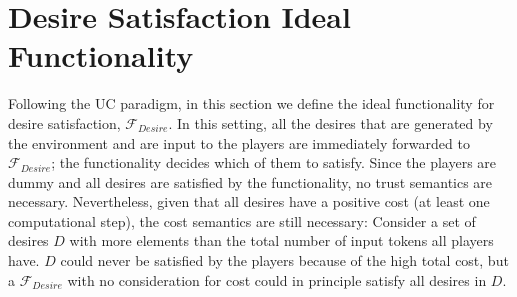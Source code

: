 \section{Desire Satisfaction Ideal Functionality}
  Following the UC paradigm, in this section we define the ideal functionality for desire satisfaction, $\mathcal{F}_{Desire}$.
  In this setting, all the desires that are generated by the environment and are input to the players are immediately forwarded
  to $\mathcal{F}_{Desire}$; the functionality decides which of them to satisfy. Since the players are dummy and all desires
  are satisfied by the functionality, no trust semantics are necessary. Nevertheless, given that all desires have a positive
  cost (at least one computational step), the cost semantics are still necessary: Consider a set of desires $D$ with more
  elements than the total number of input tokens all players have. $D$ could never be satisfied by the players because of the
  high total cost, but a $\mathcal{F}_{Desire}$ with no consideration for cost could in principle satisfy all desires in $D$. 
